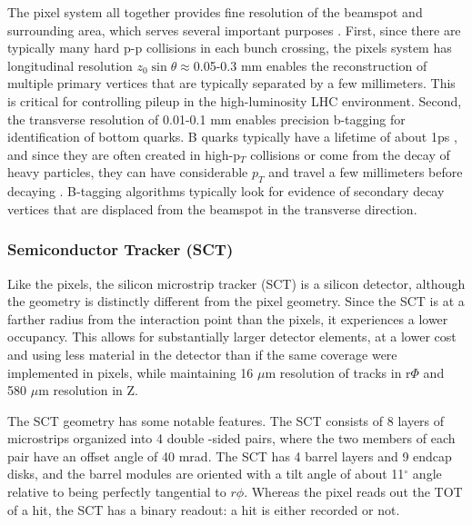The pixel system all together provides fine resolution of the beamspot and surrounding area, which serves several important purposes
.  First, since there are typically many hard p-p collisions in each bunch crossing, the pixels 
system has longitudinal resolution $z_0\sin\theta\approx$0.05-0.3 mm 
enables the reconstruction of multiple primary vertices that are typically separated by a few millimeters.  This 
is critical for controlling pileup in the high-luminosity LHC environment.  Second, the transverse resolution of 0.01-0.1 mm 
enables precision b-tagging for identification of bottom quarks.  B quarks typically have a lifetime of about 1ps
, and since they are often created in high-p$_T$ collisions or come from the decay 
of heavy particles, they can have considerable $p_T$ and travel a few millimeters before decaying
.  B-tagging algorithms typically look for evidence of secondary decay vertices that are displaced from the beamspot in 
the transverse direction.   


\subsubsection{Semiconductor Tracker (SCT)}
\label{sec:sct}
Like the pixels, the silicon microstrip tracker (SCT) is a silicon detector, although the geometry is 
distinctly different from the pixel geometry.  Since the SCT is at a farther radius from the interaction point than 
the pixels, it experiences a lower occupancy.  This allows for substantially larger detector elements, at a lower 
cost and using less material in the detector than if the same coverage were implemented in pixels, while maintaining 
16 $\mu$m resolution of tracks in r$\Phi$ and 580 $\mu$m resolution in Z.   

The SCT geometry has some notable features.  The SCT consists of 8 layers of microstrips organized into 4 double
-sided pairs, where the two members of each pair have an offset angle of 40 mrad.  The 
SCT has 4 barrel layers and 9 endcap disks, and the barrel modules are oriented with a tilt angle 
of about 11$^\circ$ angle relative to being perfectly tangential to $r\phi$.  Whereas the 
pixel reads out the TOT of a hit, the SCT has a binary readout: a hit is either recorded or not.



